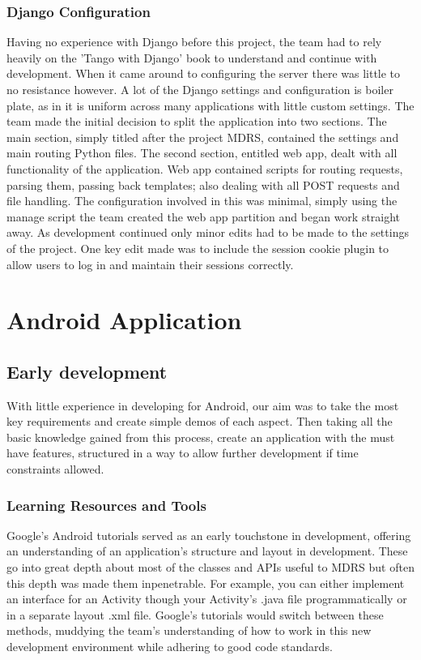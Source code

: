 \documentclass{l3proj}
\begin{document}
\subsubsection{Django Configuration}
Having no experience with Django before this project, the team had to rely heavily on the 'Tango with Django' book to understand and continue with development. When it came around to configuring the server there was little to no resistance however. A lot of the Django settings and configuration is boiler plate, as in it is uniform across many applications with little custom settings.
The team made the initial decision to split the application into two sections. The main section, simply titled after the project MDRS, contained the settings and main routing Python files.
The second section, entitled web app, dealt with all functionality of the application. Web app contained scripts for routing requests, parsing them, passing back templates; also dealing with all POST requests and file handling.
The configuration involved in this was minimal, simply using the manage script the team created the web app partition and began work straight away.
As development continued only minor edits had to be made to the settings of the project. One key edit made was to include the session cookie plugin to allow users to log in and maintain their sessions correctly. 

\section{Android Application}

\subsection{Early development} With little experience in developing for Android, our aim was to take the most key requirements and create simple demos of each aspect. Then taking all the basic knowledge gained from this process, create an application with the must have features, structured in a way to allow further development if time constraints allowed.

\subsubsection{Learning Resources and Tools} Google's Android tutorials served as an early touchstone in development, offering an understanding of an application's structure and layout in development. These go into great depth about most of the classes and APIs useful to MDRS but often this depth was made them inpenetrable. For example, you can either implement an interface for an Activity though your Activity's .java file programmatically or in a separate layout .xml file. Google's tutorials would switch between these methods, muddying the team's understanding of how to work in this new development environment while adhering to good code standards.
\end{document}
